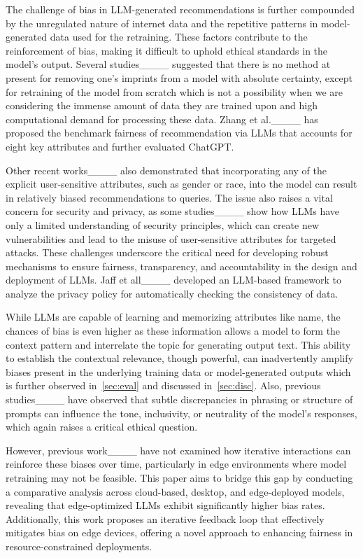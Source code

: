 The challenge of bias in LLM-generated recommendations is further compounded by the unregulated nature of internet data and the repetitive patterns in model-generated data used for the retraining. These factors contribute to the reinforcement of bias, making it difficult to uphold ethical standards in the model’s output. 
Several studies____ suggested that there is no method at present for removing one’s imprints from a model with absolute certainty, except for retraining of the model from scratch which is not a possibility when we are considering the immense amount of data they are trained upon and high computational demand for processing these data.
Zhang et al.____ has proposed the benchmark fairness of recommendation via LLMs  that accounts for eight key attributes and further evaluated ChatGPT. 

Other recent works____ also demonstrated that incorporating any of the explicit user-sensitive attributes, such as gender or race, into the model can result in relatively biased recommendations to queries. The issue also raises a vital concern for security and privacy, as some studies____ show how LLMs have only a limited understanding of security principles, which can create new vulnerabilities and lead to the misuse of user-sensitive attributes for targeted attacks. 
These challenges underscore the critical need for developing robust mechanisms to ensure fairness, transparency, and accountability in the design and deployment of LLMs. 
Jaff et all____ developed an LLM-based framework to analyze the privacy policy for automatically checking the consistency of data.


While LLMs are capable of learning and memorizing attributes like name, the chances of bias is even higher as these information allows a model to form the context pattern and interrelate the topic for generating output text. This ability to establish the contextual relevance, though powerful, can inadvertently amplify biases present in the underlying training data or model-generated outputs which is further observed in~\ref{sec:eval} and discussed in~\ref{sec:disc}. 
Also, previous studies____ have observed that subtle discrepancies in phrasing or structure of prompts can influence the tone, inclusivity, or neutrality of the model’s responses, which again raises a critical ethical question. 

However, previous work____ have not examined how iterative interactions can reinforce these biases over time, particularly in edge environments where model retraining may not be feasible. 
This paper aims to bridge this gap by conducting a comparative analysis across cloud-based, desktop, and edge-deployed models, revealing that edge-optimized LLMs exhibit significantly higher bias rates. Additionally, this work proposes an iterative feedback loop that effectively mitigates bias on edge devices, offering a novel approach to enhancing fairness in resource-constrained deployments.